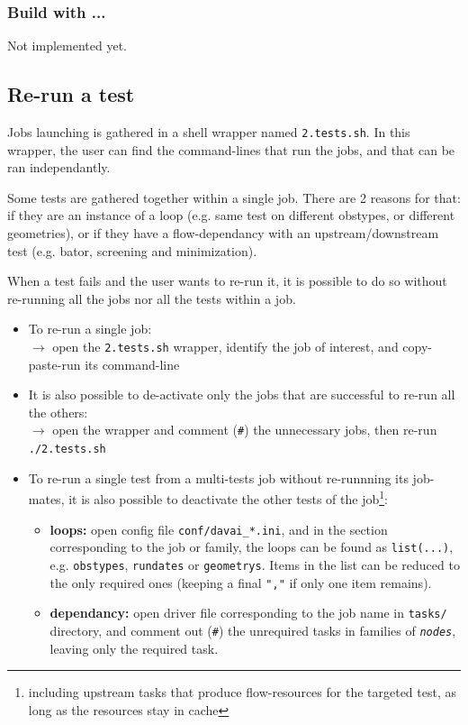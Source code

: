 \documentclass[a4paper,10pt,twoside]{article}
\begin{document}
\subsubsection{Build with ...}
Not implemented yet.

\subsection{Re-run a test}

Jobs launching is gathered in a shell wrapper named \texttt{2.tests.sh}.
In this wrapper, the user can find the command-lines that run the jobs, and that can be ran independantly.

Some tests are gathered together within a single job. There are 2 reasons for that: if they are an instance of a loop (e.g. same test on different obstypes, or different geometries), or if they have a flow-dependancy with an upstream/downstream test (e.g. bator, screening and minimization).

When a test fails and the user wants to re-run it, it is possible to do so without re-running all the jobs nor all the tests within a job.

\begin{itemize}
 \item To re-run a single job:\\
       $\rightarrow$ open the \texttt{2.tests.sh} wrapper, identify the job of interest, and copy-paste-run its command-line
 \item It is also possible to de-activate only the jobs that are successful to re-run all the others:\\
       $\rightarrow$ open the wrapper and comment (\texttt{\#}) the unnecessary jobs, then re-run \texttt{./2.tests.sh}
 \item To re-run a single test from a multi-tests job without re-runnning its job-mates, it is also possible to deactivate the other tests of the job\footnote{including upstream tasks that produce flow-resources for the targeted test, as long as the resources stay in cache}:
       \begin{itemize}[label=$\rightarrow$]
        \item \textbf{loops:} open config file \texttt{conf/davai\_*.ini}, and in the section corresponding to the job or family, the loops can be found as \texttt{list(...)}, e.g. \texttt{obstypes}, \texttt{rundates} or \texttt{geometrys}. Items in the list can be reduced to the only required ones (keeping a final \texttt{","} if only one item remains).
        \item \textbf{dependancy:} open driver file corresponding to the job name in \texttt{tasks/} directory, and comment out (\texttt{\#}) the unrequired tasks in families of \textit{\texttt{nodes}}, leaving only the required task.
       \end{itemize}
\end{itemize}
\end{document}

